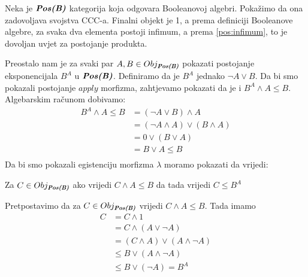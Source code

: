   \begin{example}
    Neka je $\textbf{\emph{Pos(B)}}$ kategorija koja odgovara Booleanovoj algebri. Pokažimo da ona zadovoljava svojstva CCC-a. Finalni objekt je 1, a prema definiciji Booleanove algebre, za svaka dva elementa postoji infimum, a prema \ref{pos:infimum}, to je dovoljan uvjet za postojanje produkta.

    Preostalo nam je za svaki par $A, B \in Obj_{\textbf{\emph{Pos(B)}}}$ pokazati postojanje eksponencijala $B^A$ u $\textbf{\emph{Pos(B)}}$. Definiramo da je $B^A$ jednako $\neg A \vee B$. Da bi smo pokazali postojanje $apply$ morfizma, zahtjevamo pokazati da je i $B^A \wedge A \leq B$. Algebarskim računom dobivamo:
    \begin{align*}
      B^A \wedge A \leq B &= (\neg A \vee B) \wedge A\\
                        &= (\neg A \wedge A) \vee (B \wedge A)\\
                        &= 0 \vee (B \vee A)\\
                        &= B \vee A \leq B \\
    \end{align*}
    Da bi smo pokazali egistenciju morfizma $\lambda$ moramo pokazati da vrijedi:
    \begin{center}
      Za $C \in Obj_{\textbf{\emph{Pos(B)}}}$ ako vrijedi $C \wedge A \leq B$ da tada vrijedi $C \leq B^A$
    \end{center}
    Pretpostavimo da za $C \in Obj_{\textbf{\emph{Pos(B)}}}$ vrijedi $C \wedge A \leq B$. Tada imamo
    \begin{align*}
      C &= C \wedge 1\\
        &= C \wedge (A \vee \neg A)\\
        &= (C \wedge A) \vee (A \wedge \neg A)\\
        &\leq B \vee (A \wedge \neg A)\\
        &\leq B \vee (\neg A) = B^A \\
    \end{align*}

  \end{example}
  \newpage
